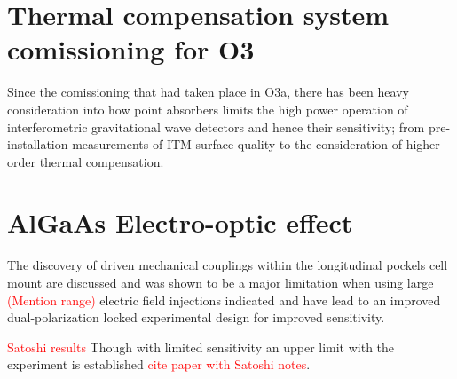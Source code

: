 \section{Thermal compensation system comissioning for O3}
Since the comissioning that had taken place in O3a, there has been heavy consideration into how point absorbers limits the high power operation of interferometric gravitational wave detectors and hence their sensitivity; from pre-installation measurements of ITM surface quality to the consideration of higher order thermal compensation.

\section{AlGaAs Electro-optic effect}
The discovery of driven mechanical couplings within the longitudinal pockels cell mount are discussed and was shown to be a major limitation when using large \textcolor{red}{(Mention range)} electric field injections indicated and have lead to an improved dual-polarization locked experimental design for improved sensitivity.

\textcolor{red}{Satoshi results}
Though with limited sensitivity an upper limit with the experiment is established \textcolor{red}{cite paper with Satoshi notes}.
